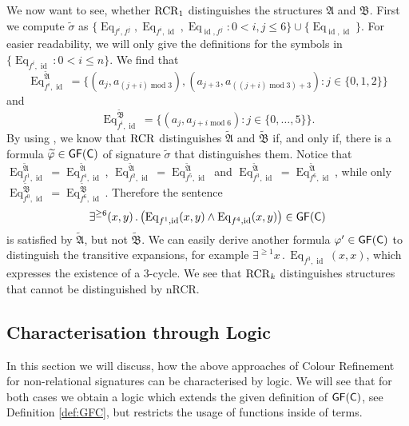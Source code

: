We now want to see, whether $\operatorname{RCR}_1$ distinguishes the structures $\mathfrak A$ and $\mathfrak B$.
First we compute $\widetilde\sigma$ as $\{\operatorname{Eq}_{f^i,f^j}, \operatorname{Eq}_{f^i,\operatorname{id}}, \operatorname{Eq}_{\operatorname{id},f^j} : 0< i,j \leq 6\}\cup\{\operatorname{Eq}_{\operatorname{id},\operatorname{id}}\}$. 
For easier readability, we will only give the definitions for the symbols in $\{\operatorname{Eq}_{f^i,\operatorname{id}} : 0 < i \leq n\}$. 
We find that 
$$\operatorname{Eq}_{f^i,\operatorname{id}}^{\widetilde{\mathfrak A}} = \{(a_j,a_{(j+i) \operatorname{mod} 3}),(a_{j+3}, a_{((j+i)\operatorname{mod} 3)+3}) : j \in \{0,1,2\}\}$$
and 
$$\operatorname{Eq}_{f^i,\operatorname{id}}^{\widetilde{\mathfrak B}} = \{(a_j,a_{j+i \operatorname{mod} 6}) : j \in \{0,\dots,5\}\}.$$
By using \cite{scheidt2025ColorRefinement}, we know that $\operatorname{RCR}$ distinguishes $\widetilde{\mathfrak A}$ and $\widetilde{\mathfrak B}$ if, and only if, there is a formula $\widetilde{\varphi}\in\mathsf{GF}(\mathsf{C})$ of signature $\widetilde{\sigma}$ that distinguishes them.
Notice that $\operatorname{Eq}_{f^1,\operatorname{id}}^{\widetilde{\mathfrak A}}=\operatorname{Eq}_{f^4,\operatorname{id}}^{\widetilde{\mathfrak A}}$, $\operatorname{Eq}_{f^2,\operatorname{id}}^{\widetilde{\mathfrak A}}=\operatorname{Eq}_{f^5,\operatorname{id}}^{\widetilde{\mathfrak A}}$ and $\operatorname{Eq}_{f^3,\operatorname{id}}^{\widetilde{\mathfrak A}}=\operatorname{Eq}_{f^6,\operatorname{id}}^{\widetilde{\mathfrak A}}$, while only $\operatorname{Eq}_{f^0,\operatorname{id}}^{\widetilde{\mathfrak B}}=\operatorname{Eq}_{f^6,\operatorname{id}}^{\widetilde{\mathfrak B}}$.
Therefore the sentence 
$$\exists^{\geq 6}(x,y)\operatorname{.}\left(\operatorname{Eq}_{f^1,\operatorname{id}}(x,y) \land \operatorname{Eq}_{f^4,\operatorname{id}}(x,y)\right)\in \mathsf{GF}(\mathsf{C})$$ 
is satisfied by $\widetilde{\mathfrak A}$, but not $\widetilde{\mathfrak B}$.
We can easily derive another formula $\varphi'\in \mathsf{GF}(\mathsf{C})$ to distinguish the transitive expansions, for example $\exists^{\geq 1} x\operatorname{.} \operatorname{Eq}_{f^3, \operatorname{id}}(x, x)$, which expresses the existence of a $3$-cycle.
We see that $\operatorname{RCR}_k$ distinguishes structures that cannot be distinguished by nRCR.

\subsection{Characterisation through Logic}
\label{sec:RCRwithFnLogic}

In this section we will discuss, how the above approaches of Colour Refinement for non-relational signatures can be characterised by logic.
We will see that for both cases we obtain a logic which extends the given definition of $\mathsf{GF}(\mathsf{C})$, see Definition \ref{def:GFC}, but restricts the usage of functions inside of terms.

